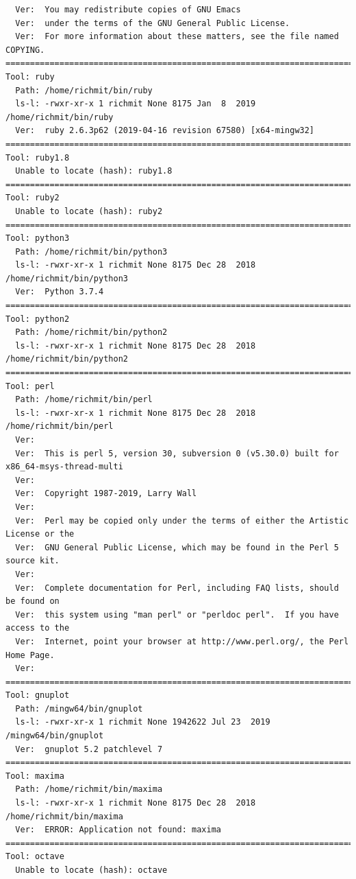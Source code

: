 \documentclass[11pt]{article}
\begin{document}
\begin{verbatim}
  Ver:  You may redistribute copies of GNU Emacs
  Ver:  under the terms of the GNU General Public License.
  Ver:  For more information about these matters, see the file named COPYING.
==========================================================================================
Tool: ruby
  Path: /home/richmit/bin/ruby
  ls-l: -rwxr-xr-x 1 richmit None 8175 Jan  8  2019 /home/richmit/bin/ruby
  Ver:  ruby 2.6.3p62 (2019-04-16 revision 67580) [x64-mingw32]
==========================================================================================
Tool: ruby1.8
  Unable to locate (hash): ruby1.8
==========================================================================================
Tool: ruby2
  Unable to locate (hash): ruby2
==========================================================================================
Tool: python3
  Path: /home/richmit/bin/python3
  ls-l: -rwxr-xr-x 1 richmit None 8175 Dec 28  2018 /home/richmit/bin/python3
  Ver:  Python 3.7.4
==========================================================================================
Tool: python2
  Path: /home/richmit/bin/python2
  ls-l: -rwxr-xr-x 1 richmit None 8175 Dec 28  2018 /home/richmit/bin/python2
==========================================================================================
Tool: perl
  Path: /home/richmit/bin/perl
  ls-l: -rwxr-xr-x 1 richmit None 8175 Dec 28  2018 /home/richmit/bin/perl
  Ver:  
  Ver:  This is perl 5, version 30, subversion 0 (v5.30.0) built for x86_64-msys-thread-multi
  Ver:  
  Ver:  Copyright 1987-2019, Larry Wall
  Ver:  
  Ver:  Perl may be copied only under the terms of either the Artistic License or the
  Ver:  GNU General Public License, which may be found in the Perl 5 source kit.
  Ver:  
  Ver:  Complete documentation for Perl, including FAQ lists, should be found on
  Ver:  this system using "man perl" or "perldoc perl".  If you have access to the
  Ver:  Internet, point your browser at http://www.perl.org/, the Perl Home Page.
  Ver:  
==========================================================================================
Tool: gnuplot
  Path: /mingw64/bin/gnuplot
  ls-l: -rwxr-xr-x 1 richmit None 1942622 Jul 23  2019 /mingw64/bin/gnuplot
  Ver:  gnuplot 5.2 patchlevel 7
==========================================================================================
Tool: maxima
  Path: /home/richmit/bin/maxima
  ls-l: -rwxr-xr-x 1 richmit None 8175 Dec 28  2018 /home/richmit/bin/maxima
  Ver:  ERROR: Application not found: maxima
==========================================================================================
Tool: octave
  Unable to locate (hash): octave

\end{verbatim}
\end{document}
